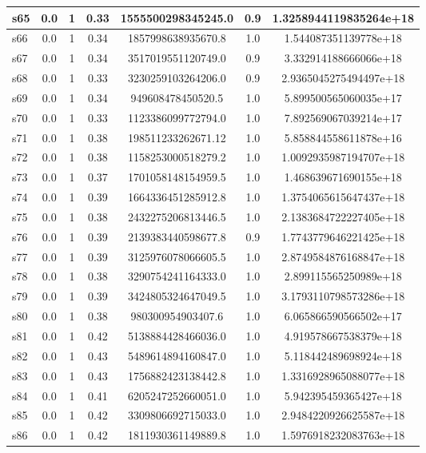 \documentclass{article}
\begin{document}
\begin{tabular}{|l|c|c|c|c|c|c|}
\hline
s65 &0.0 & 1 & 0.33 & 1555500298345245.0 & 0.9 & 1.3258944119835264e+18\\
\hline
s66 &0.0 & 1 & 0.34 & 1857998638935670.8 & 1.0 & 1.544087351139778e+18\\
\hline
s67 &0.0 & 1 & 0.34 & 3517019551120749.0 & 0.9 & 3.332914188666066e+18\\
\hline
s68 &0.0 & 1 & 0.33 & 3230259103264206.0 & 0.9 & 2.9365045275494497e+18\\
\hline
s69 &0.0 & 1 & 0.34 & 949608478450520.5 & 1.0 & 5.899500565060035e+17\\
\hline
s70 &0.0 & 1 & 0.33 & 1123386099772794.0 & 1.0 & 7.892569067039214e+17\\
\hline
s71 &0.0 & 1 & 0.38 & 198511233262671.12 & 1.0 & 5.858844558611878e+16\\
\hline
s72 &0.0 & 1 & 0.38 & 1158253000518279.2 & 1.0 & 1.0092935987194707e+18\\
\hline
s73 &0.0 & 1 & 0.37 & 1701058148154959.5 & 1.0 & 1.468639671690155e+18\\
\hline
s74 &0.0 & 1 & 0.39 & 1664336451285912.8 & 1.0 & 1.3754065615647437e+18\\
\hline
s75 &0.0 & 1 & 0.38 & 2432275206813446.5 & 1.0 & 2.1383684722227405e+18\\
\hline
s76 &0.0 & 1 & 0.39 & 2139383440598677.8 & 0.9 & 1.7743779646221425e+18\\
\hline
s77 &0.0 & 1 & 0.39 & 3125976078066605.5 & 1.0 & 2.8749584876168847e+18\\
\hline
s78 &0.0 & 1 & 0.38 & 3290754241164333.0 & 1.0 & 2.899115565250989e+18\\
\hline
s79 &0.0 & 1 & 0.39 & 3424805324647049.5 & 1.0 & 3.1793110798573286e+18\\
\hline
s80 &0.0 & 1 & 0.38 & 980300954903407.6 & 1.0 & 6.065866590566502e+17\\
\hline
s81 &0.0 & 1 & 0.42 & 5138884428466036.0 & 1.0 & 4.919578667538379e+18\\
\hline
s82 &0.0 & 1 & 0.43 & 5489614894160847.0 & 1.0 & 5.118442489698924e+18\\
\hline
s83 &0.0 & 1 & 0.43 & 1756882423138442.8 & 1.0 & 1.3316928965088077e+18\\
\hline
s84 &0.0 & 1 & 0.41 & 6205247252660051.0 & 1.0 & 5.942395459365427e+18\\
\hline
s85 &0.0 & 1 & 0.42 & 3309806692715033.0 & 1.0 & 2.9484220926625587e+18\\
\hline
s86 &0.0 & 1 & 0.42 & 1811930361149889.8 & 1.0 & 1.5976918232083763e+18\\

\end{tabular}
\end{document}
